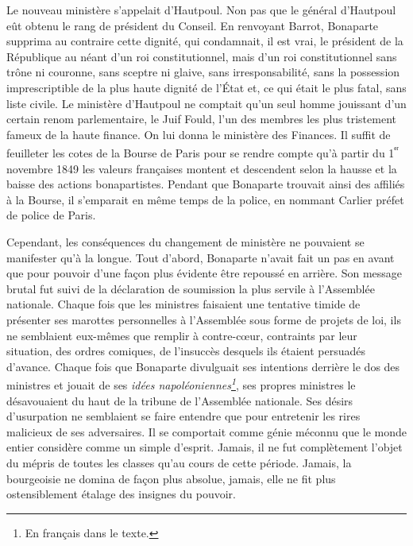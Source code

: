 \documentclass[french,twoside]{book} %
\begin{document}
Le nouveau ministère s’appelait d’Hautpoul. Non pas que le général d’Hautpoul eût obtenu le rang de président du Conseil. En renvoyant Barrot, Bonaparte supprima au contraire cette dignité, qui condamnait, il est vrai, le président de la République au néant d’un roi constitutionnel, mais d’un roi constitutionnel sans trône ni couronne, sans sceptre ni glaive, sans irresponsabilité, sans la possession imprescriptible de la plus haute dignité de l’État et, ce qui était le plus fatal, sans liste civile. Le ministère d’Hautpoul ne comptait qu’un seul homme jouissant d’un certain renom parlementaire, le Juif Fould, l’un des membres les plus tristement fameux de la haute finance. On lui donna le ministère des Finances. Il suffit de feuilleter les cotes de la Bourse de Paris pour se rendre compte qu’à partir du 1\textsuperscript{ᵉʳ} novembre 1849 les valeurs françaises montent et descendent selon la hausse et la baisse des actions bonapartistes. Pendant que Bonaparte trouvait ainsi des affiliés à la Bourse, il s’emparait en même temps de la police, en nommant Carlier préfet de police de Paris.\par
Cependant, les conséquences du changement de ministère ne pouvaient se manifester qu’à la longue. Tout d’abord, Bonaparte n’avait fait un pas en avant que pour pouvoir d’une façon plus évidente être repoussé en arrière. Son message brutal fut suivi de la déclaration de soumission la plus servile à l’Assemblée nationale. Chaque fois que les ministres faisaient une tentative timide de présenter ses marottes personnelles à l’Assemblée sous forme de projets de loi, ils ne semblaient eux-mêmes que remplir à contre-cœur, contraints par leur situation, des ordres comiques, de l’insuccès desquels ils étaient persuadés d’avance. Chaque fois que Bonaparte divulguait ses intentions derrière le dos des ministres et jouait de ses \emph{idées napoléoniennes\footnote{En français dans le texte.}}, ses propres ministres le désavouaient du haut de la tribune de l’Assemblée nationale. Ses désirs d’usurpation ne semblaient se faire entendre que pour entretenir les rires malicieux de ses adversaires. Il se comportait comme génie méconnu que le monde entier considère comme un simple d’esprit. Jamais, il ne fut complètement l’objet du mépris de toutes les classes qu’au cours de cette période. Jamais, la bourgeoisie ne domina de façon plus absolue, jamais, elle ne fit plus ostensiblement étalage des insignes du pouvoir.\par
\end{document}
